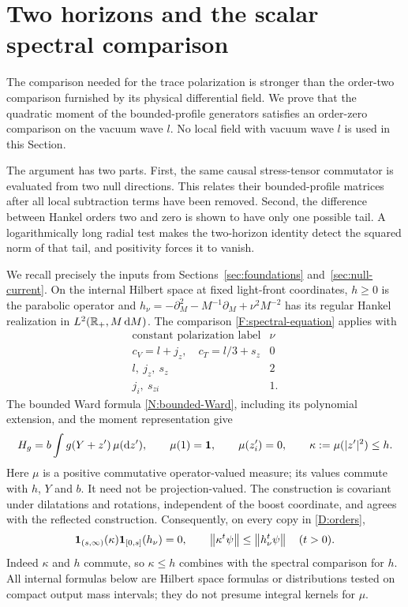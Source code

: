\section{Two horizons and the scalar spectral comparison}
\label{sec:dispersion}

The comparison needed for the trace polarization is stronger than the
order-two comparison furnished by its physical differential field.
We prove that the quadratic moment of the bounded-profile generators
satisfies an order-zero comparison on the vacuum wave $l$.
No local field with vacuum wave $l$ is used in this Section.

The argument has two parts.  First, the same causal stress-tensor
commutator is evaluated from two null directions.  This relates their
bounded-profile matrices after all local subtraction terms have been
removed.  Second, the difference between Hankel orders two and zero is
shown to have only one possible tail.  A logarithmically long radial
test makes the two-horizon identity detect the squared norm of that
tail, and positivity forces it to vanish.

We recall precisely the inputs from Sections~\ref{sec:foundations}
and~\ref{sec:null-current}.  On the internal Hilbert space at fixed
light-front coordinates, $h\geq0$ is the parabolic operator and
$h_\nu=-\partial_M^2-M^{-1}\partial_M+\nu^2M^{-2}$ has its regular
Hankel realization in $L^2(\mathbb R_+,M\,\mathrm d M)$.  The comparison
\eqref{F:spectral-equation} applies with
\begin{equation}\label{D:orders}
\begin{array}{c|c}
 \text{constant polarization label}&\nu\\ \hline
 c_V=l+j_z,\quad c_T=l/3+s_z&0\\
 l,\ j_z,\ s_z&2\\
 j_i,\ s_{zi}&1.
\end{array}
\end{equation}
The bounded Ward formula \eqref{N:bounded-Ward}, including its polynomial
extension, and the moment representation give
\begin{equation}\label{D:measure-input}
 H_g=b\int g(Y+z')\,\mu(\mathrm d z'),\qquad
 \mu(1)=\mathbf 1,\qquad \mu(z'_i)=0,\qquad
 \kappa:=\mu(|z'|^2)\leq h.
\end{equation}
Here $\mu$ is a positive commutative operator-valued measure; its values
commute with $h$, $Y$ and $b$.  It need not be projection-valued.
The construction is covariant under dilatations and rotations, independent
of the boost coordinate, and agrees with the reflected construction.
Consequently, on every copy in \eqref{D:orders},
\begin{equation}\label{D:inherited-comparison}
 \mathbf1_{(s,\infty)}(\kappa)\mathbf1_{[0,s]}(h_\nu)=0,
 \qquad \left\lVert\kappa^t\psi\right\rVert\leq\left\lVert h_\nu^t\psi\right\rVert
 \quad(t>0).
\end{equation}
Indeed $\kappa$ and $h$ commute, so $\kappa\leq h$ combines with the
spectral comparison for $h$.  All internal formulas below are Hilbert
space formulas or distributions tested on compact output mass intervals;
they do not presume integral kernels for $\mu$.


